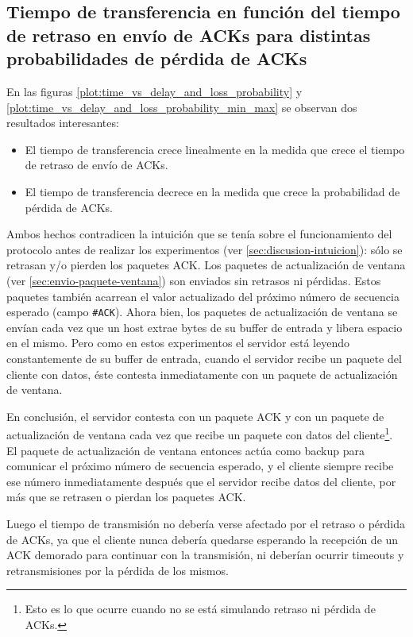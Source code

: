 \documentclass[a4paper, 10pt, twoside]{article}
\newcommand{\ack}{\texttt{\#ACK}\xspace}
\begin{document}
\subsection{Tiempo de transferencia en función del tiempo de retraso en envío de ACKs para distintas probabilidades de pérdida de ACKs}

En las figuras \ref{plot:time_vs_delay_and_loss_probability} y \ref{plot:time_vs_delay_and_loss_probability_min_max} se observan dos resultados interesantes:

\begin{itemize}
  \item El tiempo de transferencia crece linealmente en la medida que crece el tiempo de retraso de envío de ACKs.

  \item El tiempo de transferencia decrece en la medida que crece la probabilidad de pérdida de ACKs.
\end{itemize}

Ambos hechos contradicen la intuición que se tenía sobre el funcionamiento del protocolo antes de realizar los experimentos (ver \ref{sec:discusion-intuicion}): sólo se retrasan y/o pierden los paquetes ACK. Los paquetes de actualización de ventana (ver \ref{sec:envio-paquete-ventana}) son enviados sin retrasos ni pérdidas. Estos paquetes también acarrean el valor actualizado del próximo número de secuencia esperado (campo \ack). Ahora bien, los paquetes de actualización de ventana se envían cada vez que un host extrae bytes de su buffer de entrada y libera espacio en el mismo. Pero como en estos experimentos el servidor está leyendo constantemente de su buffer de entrada, cuando el servidor recibe un paquete del cliente con datos, éste contesta inmediatamente con un paquete de actualización de ventana.

En conclusión, el servidor contesta con un paquete ACK y con un paquete de actualización de ventana cada vez que recibe un paquete con datos del cliente\footnote{Esto es lo que ocurre cuando no se está simulando retraso ni pérdida de ACKs.}. El paquete de actualización de ventana entonces actúa como backup para comunicar el próximo número de secuencia esperado, y el cliente siempre recibe ese número inmediatamente después que el servidor recibe datos del cliente, por más que se retrasen o pierdan los paquetes ACK.

Luego el tiempo de transmisión no debería verse afectado por el retraso o pérdida de ACKs, ya que el cliente nunca debería quedarse esperando la recepción de un ACK demorado para continuar con la transmisión, ni deberían ocurrir timeouts y retransmisiones por la pérdida de los mismos.
\end{document}
